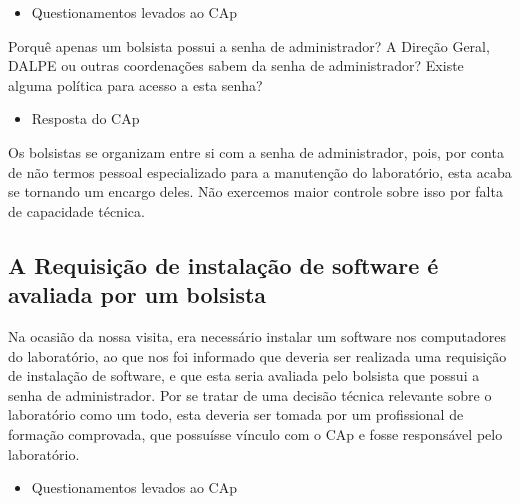 \begin{itemize}
    \item Questionamentos levados ao CAp
\end{itemize}

Porquê apenas um bolsista possui a senha de administrador? A Direção Geral, DALPE ou outras coordenações sabem da senha de administrador? Existe alguma política para acesso a esta senha?

\begin{itemize}
    \item Resposta do CAp
\end{itemize}

Os bolsistas se organizam entre si com a senha de administrador, pois, por conta de não termos pessoal especializado para a manutenção do laboratório, esta acaba se tornando um encargo deles. Não exercemos maior controle sobre isso por falta de capacidade técnica.

\subsection{A Requisição de instalação de software é avaliada por um bolsista}\label{sec:LABEL_CHP_REL_SEC_PROBS_SUBSEC_REQ_INST}

Na ocasião da nossa visita, era necessário instalar um software nos computadores do laboratório, ao que nos foi informado que deveria ser realizada uma requisição de instalação de software, e que esta seria avaliada pelo bolsista que possui a senha de administrador. Por se tratar de uma decisão técnica relevante sobre o laboratório como um todo, esta deveria ser tomada por um profissional de formação comprovada, que possuísse vínculo com o CAp e fosse responsável pelo laboratório.

\begin{itemize}
    \item Questionamentos levados ao CAp
\end{itemize}

